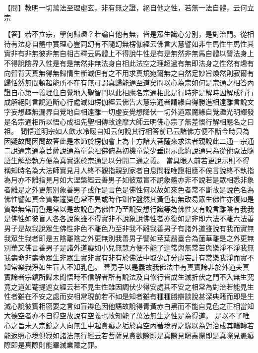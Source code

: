 {  {\heiti 【問】教明一切萬法至理虛玄，非有無之證，絕自他之性，若無一法自體，云何立宗}
  
  【答】若不立宗，學何歸趣？若論自他有無，皆是眾生識心分別，是對治門。從相待有法身自體中實理心豈同幻有不隨幻無楞伽經云佛言大慧譬如非牛馬性牛馬性其實非有非無彼非無自相古釋云馬體上不得說牛性是有是無然非無馬自體以譬法身上不得說陰界入性是有是無然非無法身自相此法空之理超過有無即法身之性然有趣有向智背天真無得無歸情生斷滅但有之不用求真規宛爾無之自然足妙旨煥然則寂爾有歸恬然無間頓超能所不在有無可謂真歸能通至道矣問以心為宗如何是宗通之相答內證自心第一義理住自覺地入聖智門以此相應名宗通相此是行時非是解時因解成行行成解絕則言說道斷心行處滅如楞伽經云佛告大慧宗通者謂緣自得勝進相遠離言說文字妄想趣無漏界自覺地自相遠離一切虛妄覺想降伏一切外道眾魔緣自覺趣光明輝發是名宗通相所以悟心成祖先聖相傳故達摩大師云明佛心宗了無差悞行解相應名之曰祖。
問悟道明宗如人飲水冷暖自知云何說其行相答前已云諸佛方便不斷今時只為因疑故問因問故答此是本師於楞伽會上為十方諸大菩薩來求法者親說此二通一宗通二說通宗通為菩薩說通為童蒙祖佛俯為初機童蒙少垂開示此約說通只為從他覔法隨語生解恐執方便為真實迷於宗通是以分開二通之義。
當具眼人前若更說示則不得稱知時名為大法師實見月人終不觀指親到家者自息問程唯證相應不俟言說終不執指為月亦不離指見月如大涅槃經云善男子如彼眾盲不說象體亦非不說若是眾相悉非象者離是之外更無別象善男子或作是言色是佛性何以故如來色者常不斷故是說色名為佛性譬如真金質雖遷變色常不異或時作釧作盤然其黃色初無改易眾生佛性亦復如是質雖無常而色是常以是故說色為佛性乃至說受想行識等為佛性又有說言離陰有我我是佛性如彼盲人各各說象雖不得實非不說象說佛性者亦復如是非即六法不離六法善男子是故我說眾生佛性非色不離色乃至非我不離我善男子有諸外道雖說有我而實無我眾生我者即是五陰離陰之外更無別我善男子譬如莖葉鬚臺合為蓮華離是之外更無別華又佛言善男子是諸外道癡如小兒無慧方便不能了達常與無常苦與樂淨不淨我無我壽命非壽命眾生非眾生實非實有非有於佛法中取少許分虛妄計有常樂我淨而實不知常樂我淨如生盲人不知乳色。
善男子以是義故我佛法中有真實諦非於外道夫真實諦者宗鏡所歸未聞悟時不信解者所有說法及自修行皆成生滅折伏之門不入無生究竟之道如菴提遮女經云若不見生性雖因調伏少得安處其不安之相常為對治若能見生性者雖在不安之處而安相常現前若不如是知者雖有種種勝辯談說甚深典籍而即是生滅心說彼實相密要之言如盲辯色因他語故說得青黃赤白黑而不能自見色之正相當知大德空者亦不自得空故說有空義也故知能了萬法無生之性是為得道。
是以不了唯心之旨未入宗鏡之人向無生中起貪癡之垢於真空內著境界之緣以為對治成其輪轉若能返照心境俱寂如諸法無行經云若菩薩見貪欲際即是真際見瞋恚際即是真際見愚癡際即是真際則能畢滅業障之罪。
}
